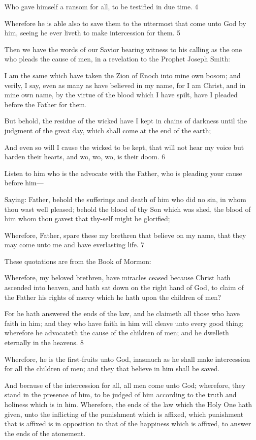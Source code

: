 Who gave himself a ransom for all, to be testified in due time. 4

Wherefore he is able also to save them to the uttermost that come unto God by him, seeing he
ever liveth to make intercession for them. 5

Then we have the words of our Savior bearing witness to his calling as the one who pleads
the cause of men, in a revelation to the Prophet Joseph Smith:

I am the same which have taken the Zion of Enoch into mine own bosom; and verily, I say,
even as many as have believed in my name, for I am Christ, and in mine own name, by the
virtue of the blood which I have spilt, have I pleaded before the Father for them.

But behold, the residue of the wicked have I kept in chains of darkness until the judgment of
the great day, which shall come at the end of the earth;

And even so will I cause the wicked to be kept, that will not hear my voice but harden their
hearts, and wo, wo, wo, is their doom. 6

Listen to him who is the advocate with the Father, who is pleading your cause before him—

Saying: Father, behold the sufferings and death of him who did no sin, in whom thou wast
well pleased; behold the blood of thy Son which was shed, the blood of him whom thou
gavest that thy-self might be glorified;

Wherefore, Father, spare these my brethren that believe on my name, that they may come
unto me and have everlasting life. 7

These quotations are from the Book of Mormon:

Wherefore, my beloved brethren, have miracles ceased because Christ hath ascended into
heaven, and hath sat down on the right hand of God, to claim of the Father his rights of
mercy which he hath upon the children of men?

For he hath answered the ends of the law, and he claimeth all those who have faith in him;
and they who have faith in him will cleave unto every good thing; wherefore he advocateth
the cause of the children of men; and he dwelleth eternally in the heavens. 8

Wherefore, he is the first-fruits unto God, inasmuch as he shall make intercession for all the
children of men; and they that believe in him shall be saved.

And because of the intercession for all, all men come unto God; wherefore, they stand in the
presence of him, to be judged of him according to the truth and holiness which is in him.
Wherefore, the ends of the law which the Holy One hath given, unto the inflicting of the
punishment which is affixed, which punishment that is affixed is in opposition to that of the
happiness which is affixed, to answer the ends of the atonement.

